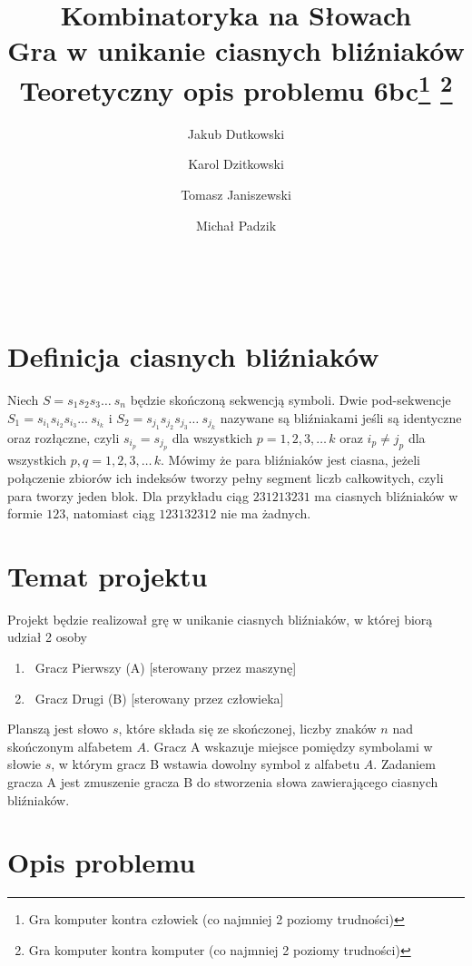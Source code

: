 \documentclass[11pt,a4paper]{article}
\author{Jakub Dutkowski}
\author{Karol Dzitkowski}
\author{Tomasz Janiszewski}
\author{Michał Padzik}
\affil{Wydział Matematyki i Nauk Informacyjnych, Politechnika Warszawska}
\title{
	Kombinatoryka na Słowach\\
	Gra w unikanie ciasnych bliźniaków\\
	Teoretyczny opis problemu
	6bc\footnote{Gra komputer kontra człowiek (co najmniej 2 poziomy trudności)}
\footnote{Gra komputer kontra komputer (co najmniej 2 poziomy trudności)}
 }
\begin{document}
\maketitle\
\newpage\


\section{Definicja ciasnych bliźniaków}
Niech $S = s_1 s_2 s_3 \ldots\ s_n$ będzie skończoną sekwencją symboli. Dwie pod-sekwencje
$S_1 = s_{i_1} s_{i_2} s_{i_3} \ldots\ s_{i_k}$ i $S_2 = s_{j_1} s_{j_2} s_{j_3} \ldots\ s_{j_k}$
nazywane są bliźniakami jeśli są identyczne oraz rozłączne, czyli $s_{i_p} = s_{j_p}$ dla
wszystkich $p = {1, 2, 3, \ldots\, k}$ oraz $ i_p \neq j_p $ dla wszystkich $ p,q = {1, 2, 3, \ldots\, k}$.
Mówimy że para bliźniaków jest ciasna, jeżeli połączenie zbiorów ich indeksów tworzy pełny segment
liczb całkowitych, czyli para tworzy jeden blok. Dla przykładu ciąg $231213231$ ma ciasnych bliźniaków
w formie $123$, natomiast ciąg $123132312$ nie ma żadnych.

\section{Temat projektu}
Projekt będzie realizował grę w unikanie ciasnych bliźniaków,
w której biorą udział 2 osoby
\begin{enumerate}
	\item\ Gracz Pierwszy (A) [sterowany przez maszynę]
	\item\ Gracz Drugi (B) [sterowany przez człowieka]
\end{enumerate}
Planszą jest słowo $s$, które składa się ze skończonej,
liczby znaków $n$ nad skończonym alfabetem $A$.
Gracz A wskazuje miejsce pomiędzy symbolami w słowie $s$, w którym gracz B
wstawia dowolny symbol z alfabetu $A$.
Zadaniem gracza A jest zmuszenie gracza B do stworzenia
słowa zawierającego ciasnych bliźniaków.

\section{Opis problemu}
\end{document}
